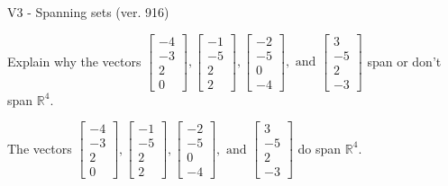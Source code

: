 \begin{exercise}
  \begin{exerciseTitle}V3 - Spanning sets (ver. 916)\end{exerciseTitle}
  \begin{exerciseStatement}
    Explain why the vectors \(\left[\begin{array}{r}
-4 \\
-3 \\
2 \\
0
\end{array}\right] , \left[\begin{array}{r}
-1 \\
-5 \\
2 \\
2
\end{array}\right] , \left[\begin{array}{r}
-2 \\
-5 \\
0 \\
-4
\end{array}\right] , \text{ and } \left[\begin{array}{r}
3 \\
-5 \\
2 \\
-3
\end{array}\right]\) span or don't span \(\mathbb{R}^4\). 
	


  \end{exerciseStatement}
  \begin{exerciseAnswer}
   The vectors \(\left[\begin{array}{r}
-4 \\
-3 \\
2 \\
0
\end{array}\right] , \left[\begin{array}{r}
-1 \\
-5 \\
2 \\
2
\end{array}\right] , \left[\begin{array}{r}
-2 \\
-5 \\
0 \\
-4
\end{array}\right] , \text{ and } \left[\begin{array}{r}
3 \\
-5 \\
2 \\
-3
\end{array}\right]\) 
  	 do  
	span \(\mathbb{R}^4\).
  


  \end{exerciseAnswer}
\end{exercise}